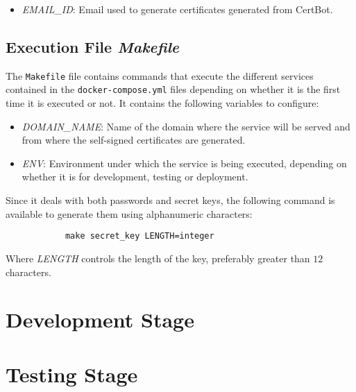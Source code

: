 \documentclass[12pt,a4paper]{article}
\begin{document}
{{\begin{itemize}[label=$\bullet$]
                \item \emph{EMAIL\_ID}: Email used to generate certificates generated from CertBot.
            \end{itemize}
        }

        \subsection{Execution File \emph{Makefile}}\label{sec:ConfExec}
        {
            The \verb*|Makefile| file contains commands that execute the different 
            services contained in the \verb*|docker-compose.yml| files depending on 
            whether it is the first time it is executed or not. It contains the 
            following variables to configure:

            \begin{itemize}[label=$\bullet$]
                \item \emph{DOMAIN\_NAME}: Name of the domain where the service will be served and from where the self-signed certificates are generated.
                \item \emph{ENV}: Environment under which the service is being executed, depending on whether it is for development, testing or deployment.
            \end{itemize}

            Since it deals with both passwords and secret keys, the following command 
            is available to generate them using alphanumeric characters:

            \begin{verbatim}
            make secret_key LENGTH=integer
            \end{verbatim}

            Where \emph{LENGTH} controls the length of the key, preferably greater 
            than $12$ characters.
        }

    }

    \newpage

    \section{Development Stage}

    \newpage

    \section{Testing Stage}
\end{document}
